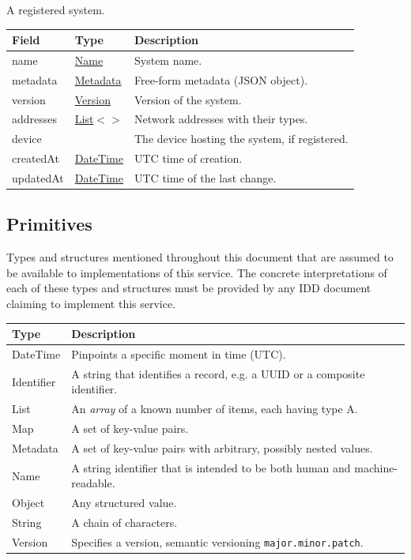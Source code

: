 \documentclass[a4paper]{arrowhead}
\newcommand{\mref}[2][]{{\textcolor{ArrowheadPurple}{\hyperref[sec:model:#2]{\ifstrempty{#1}{#2}{#1}}}}}
\newcommand{\pdef}[1]{{\textcolor{ArrowheadGrey}{#1\label{sec:model:primitives:#1}\label{sec:model:primitives:#1s}\label{sec:model:primitives:#1es}}}}
\newcommand{\pref}[1]{{\textcolor{ArrowheadGrey}{\hyperref[sec:model:primitives:#1]{#1}}}}
\begin{document}

A registered system.


\noindent\begin{tabularx}{\textwidth}{| >{\raggedright\arraybackslash}p{3.9cm} | >{\raggedright\arraybackslash\small}p{5.3cm} | X |} \hline
\rowcolor{gray!33} Field & Type & Description \\ \hline
name & \pref{Name} & System name. \\ \hline
metadata & \pref{Metadata} & Free-form metadata (JSON object). \\ \hline
version & \pref{Version} & Version of the system. \\ \hline
addresses & \pref{List}$<$\allowbreak{}\mref{Address}$>$ & Network addresses with their types. \\ \hline
device & \mref{DeviceResponseDTO} & The device hosting the system, if registered. \\ \hline
created\allowbreak{}At & \pref{DateTime} & UTC time of creation. \\ \hline
updated\allowbreak{}At & \pref{DateTime} & UTC time of the last change. \\ \hline
\end{tabularx}



\subsection{Primitives}
\label{sec:model:primitives}

Types and structures mentioned throughout this document that are assumed to be available to implementations of this service.
The concrete interpretations of each of these types and structures must be provided by any IDD document claiming to implement this service.

\noindent\begin{tabularx}{\textwidth}{| p{4.6cm} | X |} \hline
\rowcolor{gray!33} Type & Description \\ \hline
\pdef{DateTime} & Pinpoints a specific moment in time (UTC). \\ \hline
\pdef{Identifier} & A string that identifies a record, e.g. a UUID or a composite identifier. \\ \hline
\pdef{List} & An \textit{array} of a known number of items, each having type A. \\ \hline
\pdef{Map} & A set of key-value pairs. \\ \hline
\pdef{Metadata} & A set of key-value pairs with arbitrary, possibly nested values. \\ \hline
\pdef{Name} & A string identifier that is intended to be both human and machine-readable. \\ \hline
\pdef{Object} & Any structured value. \\ \hline
\pdef{String} & A chain of characters. \\ \hline
\pdef{Version} & Specifies a version, semantic versioning \texttt{major.minor.patch}. \\ \hline
\end{tabularx}
\end{document}
